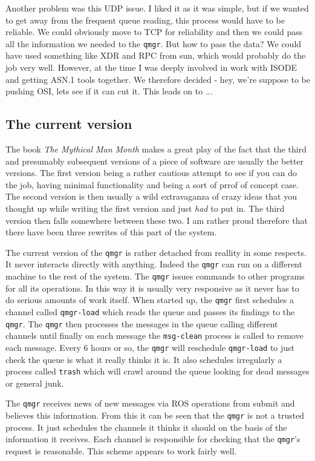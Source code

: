Another problem was this UDP issue. I liked it as it was simple, but
if we wanted to get away from the frequent queue reading, this
process would have to be reliable. We could obviously move to TCP for
reliability and then we could pass all the information we needed to
the \verb|qmgr|. But how to pass the data? We could have used something like
XDR and RPC from sun, which would probably do the job very well.
However, at the time I was deeply involved in work with ISODE and
getting ASN.1 tools together. We therefore decided - hey, we're
suppose to be pushing OSI, lets see if it can cut it. This leads on to ...

\subsection{The current version}
The book {\em The Mythical Man Month} makes a great play of the fact
that the third and presumably subsequent versions of a piece of
software are usually the better versions. The first version being a
rather cautious attempt to see if you can do the job, having minimal
functionality and being a sort of prrof of concept case. The second
version is then usually a wild extravaganza of crazy ideas that you
thought up while writing the first version and just {\em had} to put
in. The third version then falls somewhere between these two. I am
rather proud therefore that there have been three rewrites of this
part of the system.

The current version of the \verb|qmgr| is rather detached from reallity in
some respects. It never interacts directly with anything. Indeed the
\verb|qmgr| can run on a different machine to the rest of the system.
The \verb|qmgr| issues commands to other programs for all its
operations. In this way it is usually very responsive as it never has
to do serious amounts of work itself. When started up, the \verb|qmgr|
first schedules a channel called \verb|qmgr-load| which reads the
queue and passes its findings to the \verb|qmgr|. The \verb|qmgr| then
processes the messages in the queue calling different channels until
finally on each message the \verb|msg-clean| process is called to
remove each message.  Every 6 hours or so, the \verb|qmgr| will
reschedule \verb|qmgr-load| to just check the queue is what it really
thinks it is. It also schedules irregularly a process called
\verb|trash| which will crawl around the queue looking for dead
messages or general junk.

The \verb|qmgr| receives news of new messages via ROS operations from submit
and believes this information. From this it can be seen that the \verb|qmgr|
is not a trusted process. It just schedules the channels it thinks it
should on the basis of the information it receives. Each channel is
responsible for checking that the \verb|qmgr|'s request is reasonable.
This scheme appears to work fairly well. 

